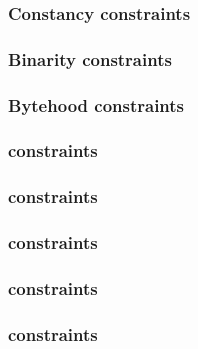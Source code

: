 \subsubsection{Constancy constraints}                                                           \label{rom: generalities: constancies}                      
\subsubsection{Binarity constraints}                                                            \label{rom: generalities: binarities}                       
\subsubsection{Bytehood constraints}                                                            \label{rom: generalities: bytehood}                         
\subsubsection{\flagSum{} constraints}                                                          \label{rom: generalities: flag sum constraints}             
\subsubsection{\weightedFlagSum{} constraints}                                                  \label{rom: generalities: weighted flag sum constraints}    
\subsubsection{\romColumnCfiMax{} constraints}                                                  \label{rom: generalities: cfi max constraints}              
\subsubsection{\romColumnCfi{} constraints}                                                     \label{rom: generalities: cfi constraints}                  
\subsubsection{\done{} constraints}                                                             \label{rom: generalities: done constraints}                 
